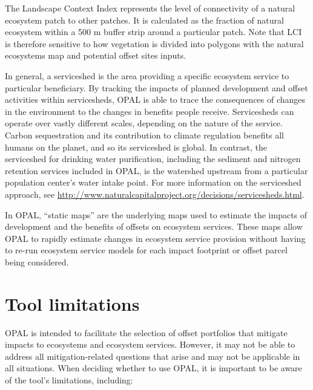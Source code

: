 \documentclass[11pt,letterpaper]{report}
\begin{document}
	\begin{description}[leftmargin=!,labelindent=!,itemindent=-0.15in]
		
		\item[Landscape Context Index (LCI):] The Landscape Context Index represents the level of connectivity of a natural ecosystem patch to other patches. It is calculated as the fraction of natural ecosystem within a 500 m buffer strip around a particular patch. Note that LCI is therefore sensitive to how vegetation is divided into polygons with the natural ecosystems map and potential offset sites inputs.
		
		\item[Serviceshed:] In general, a serviceshed is the area providing a specific ecosystem service to particular beneficiary. By tracking the impacts of planned development and offset activities within servicesheds, OPAL is able to trace the consequences of changes in the environment to the changes in benefits people receive. Servicesheds can operate over vastly different scales, depending on the nature of the service. Carbon sequestration and its contribution to climate regulation benefits all humans on the planet, and so its serviceshed is global. In contrast, the serviceshed for drinking water purification, including the sediment and nitrogen retention services included in OPAL, is the watershed upstream from a particular population center's water intake point. For more information on the serviceshed approach, see \url{http://www.naturalcapitalproject.org/decisions/servicesheds.html}.
		
		\item[Static map:] In OPAL, ``static maps'' are the underlying maps used to estimate the impacts of development and the benefits of offsets on ecosystem services. These maps allow OPAL to rapidly estimate changes in ecosystem service provision without having to re-run ecosystem service models for each impact footprint or offset parcel being considered.
	\end{description}	

\chapter{Tool limitations}

	OPAL is intended to facilitate the selection of offset portfolios that mitigate impacts to ecosystems and ecosystem services. However, it may not be able to address all mitigation-related questions that arise and may not be applicable in all situations. When deciding whether to use OPAL, it is important to be aware of the tool's limitations, including:
	
\end{document}
